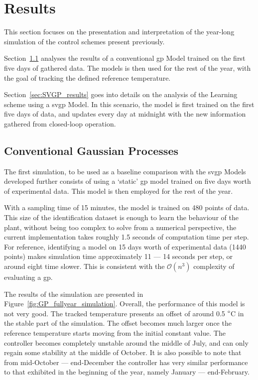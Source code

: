 \section{Results}\label{sec:results}



This section focuses on the presentation and interpretation of the year-long
simulation of the control schemes present previously.

Section~\ref{sec:GP_results} analyses the results of a conventional
\acrlong{gp} Model trained on the first five days of gathered data. The models
is then used for the rest of the year, with the goal of tracking the defined
reference temperature.

Section~\ref{sec:SVGP_results} goes into details on the analysis of the Learning
scheme using a \acrshort{svgp} Model. In this scenario, the model is first
trained on the first five days of data, and updates every day at midnight with
the new information gathered from closed-loop operation.

\subsection{Conventional Gaussian Processes}\label{sec:GP_results}

The first simulation, to be used as a baseline comparison with the
\acrshort{svgp} Models developed further consists of using a `static'
\acrshort{gp} model trained on five days worth of experimental data. This model
is then employed for the rest of the year.

With a sampling time of 15 minutes, the model is trained on 480 points of data.
This size of the identification dataset is enough to learn the behaviour of the
plant, without being too complex to solve from a numerical perspective, the
current implementation takes roughly 1.5 seconds of computation time per step.
For reference, identifying a model on 15 days worth of experimental data (1440
points) makes simulation time approximately 11 --- 14 seconds per step, or
around eight time slower. This is consistent with the $\mathcal{O}(n^3)$
complexity of evaluating a \acrshort{gp}.

The results of the simulation are presented in
Figure~\ref{fig:GP_fullyear_simulation}. Overall, the performance of this model
is not very good. The tracked temperature presents an offset of around 0.5
$\degree$C in the stable part of the simulation. The offset becomes much larger
once the reference temperature starts moving from the initial constant value.
The controller becomes completely unstable around the middle of July, and can
only regain some stability at the middle of October. It is also possible to note
that from mid-October --- end-December the controller has very similar
performance to that exhibited in the beginning of the year, namely January ---
end-February.

